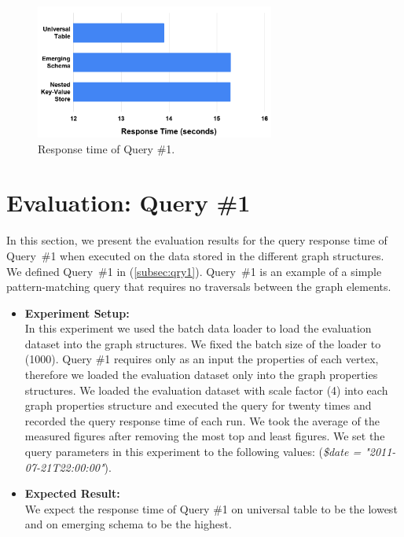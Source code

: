{\begin{itemize}
\end{itemize}



\begin{figure}[H]
\centering
\includegraphics[width=0.7\textwidth]{pics/Query1-Eval.png}
\caption{Response time of Query \#1.}
\label{fig:eval-query1}
\end{figure} 



\section{Evaluation: Query \#1}
\label{sec:eval-qry1}

In this section, we present the evaluation results for the query response time of \mbox{Query \#1} when executed on the data stored in the different graph structures. We defined \mbox{Query \#1} in (\ref{subsec:qry1}). \mbox{Query \#1} is an example of a simple pattern-matching query that requires no traversals between the graph elements.


\begin{itemize}

\item \textbf{Experiment Setup:}\\
In this experiment we used the batch data loader to load the evaluation dataset into the graph structures. We fixed the batch size of the loader to (1000). Query \#1 requires only as an input the properties of each vertex, therefore we loaded the evaluation dataset only into the graph properties structures. We loaded the evaluation dataset with scale factor (4) into each graph properties structure and executed the query for twenty times and recorded the query response time of each run. We took the average of the measured figures after removing the most top and least figures. We set the query parameters in this experiment to the following values: (\textit{\$date = "2011-07-21T22:00:00"}).


\item \textbf{Expected Result:}\\
We expect the response time of Query \#1 on universal table to be the lowest and on emerging schema to be the highest.



\end{itemize}}
